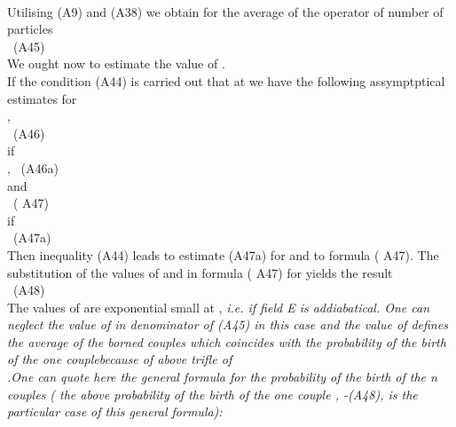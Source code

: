 \documentclass[a4paper,12pt] {article}
\begin{document}
\\ Utilising (A9) and (A38) we obtain for the average of the operator of  number of particles
\\ \coordHE{} \ (A45) \\ We
ought now to estimate the value of \myHighlight{$ \rho$}\coordHE{} .\\ If the condition (A44) is carried out that at \coordHE{}
 we have the following assymptptical estimates for
 \myHighlight{$ \rho$}\coordHE{}  \\  \coordHE{} ,
\\ \coordHE{} \ (A46)\\ if
\\ \coordHE{} , \ (A46a)\\ and
\\ \coordHE{}  \ ( A47) \\ if
\\ \coordHE{} \ (A47a) \\ Then  inequality (A44) leads to estimate (A47a) for \myHighlight{$ \rho$}\coordHE{}  and to formula ( A47).
The substitution of the values of \myHighlight{$\omega _+$}\coordHE{} and \myHighlight{$\omega _-$}\coordHE{} in formula ( A47) for \myHighlight{$ \rho$}\coordHE{}  yields the result
\\ \coordHE{} \ (A48)
\\  The values of \myHighlight{$ \rho$}\coordHE{}  are exponential small at \coordHE{},  \it i.e. if  field \rm E \it is addiabatical. \rm
One can neglect the value of
\myHighlight{$ \rho$}\coordHE{}  in  denominator of  (A45) in this case and the value of \myHighlight{$ \rho$}\coordHE{} { \it defines the average of the borned couples which coincides with the probability of the
 birth of the one couple}\rm because of above trifle of \\ \myHighlight{$ \rho$}\coordHE{} .One can quote here the general formula
 for the probability of the birth of  the n couples ( the above
probability of the birth of the one couple , -(A48), is the particular case of this general formula):
\end{document}
